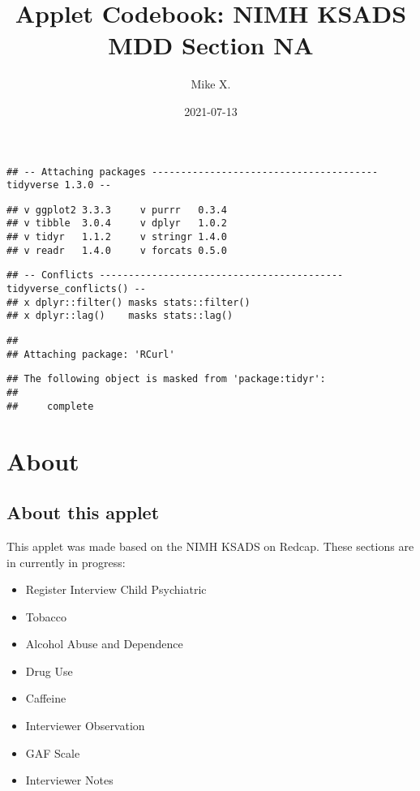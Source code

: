 \documentclass[
]{book}
\title{Applet Codebook: NIMH KSADS MDD Section NA}
\author{Mike X.}
\date{2021-07-13}
\providecommand{\tightlist}{%
  \setlength{\itemsep}{0pt}\setlength{\parskip}{0pt}}
\begin{document}
\maketitle

{
\setcounter{tocdepth}{1}
\tableofcontents
}
\begin{verbatim}
## -- Attaching packages --------------------------------------- tidyverse 1.3.0 --
\end{verbatim}

\begin{verbatim}
## v ggplot2 3.3.3     v purrr   0.3.4
## v tibble  3.0.4     v dplyr   1.0.2
## v tidyr   1.1.2     v stringr 1.4.0
## v readr   1.4.0     v forcats 0.5.0
\end{verbatim}

\begin{verbatim}
## -- Conflicts ------------------------------------------ tidyverse_conflicts() --
## x dplyr::filter() masks stats::filter()
## x dplyr::lag()    masks stats::lag()
\end{verbatim}

\begin{verbatim}
## 
## Attaching package: 'RCurl'
\end{verbatim}

\begin{verbatim}
## The following object is masked from 'package:tidyr':
## 
##     complete
\end{verbatim}

\hypertarget{part-about}{%
\part{About}\label{part-about}}

\hypertarget{intro}{%
\chapter*{About this applet}\label{intro}}

This applet was made based on the NIMH KSADS on Redcap. These sections are in currently in progress:

\begin{itemize}
\tightlist
\item
  Register Interview Child Psychiatric
\item
  Tobacco
\item
  Alcohol Abuse and Dependence
\item
  Drug Use
\item
  Caffeine
\item
  Interviewer Observation
\item
  GAF Scale
\item
  Interviewer Notes
\end{itemize}
\end{document}
